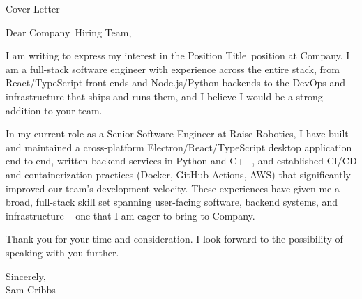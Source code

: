 \documentclass{resume}
\newcommand{\companyName}{Company}
\newcommand{\positionTitle}{Position Title}
\begin{document}
\begin{rSection}{Cover Letter}

    \normalsize

    Dear \companyName\ Hiring Team,

    \medskip

    I am writing to express my interest in the \positionTitle\ position at \companyName. I am a full-stack software engineer with experience across the entire stack, from React/TypeScript front ends and Node.js/Python backends to the DevOps and infrastructure that ships and runs them, and I believe I would be a strong addition to your team.

    \medskip

    In my current role as a Senior Software Engineer at Raise Robotics, I have built and maintained a cross-platform Electron/React/TypeScript desktop application end-to-end, written backend services in Python and C++, and established CI/CD and containerization practices (Docker, GitHub Actions, AWS) that significantly improved our team's development velocity. These experiences have given me a broad, full-stack skill set spanning user-facing software, backend systems, and infrastructure -- one that I am eager to bring to \companyName.

    \medskip

    Thank you for your time and consideration. I look forward to the possibility of speaking with you further.

    \medskip

    Sincerely, \\
    Sam Cribbs

\end{rSection}
\end{document}
